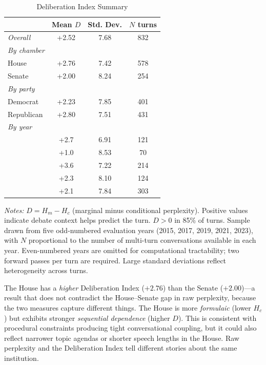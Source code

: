\documentclass[12pt]{article}
\newcommand{\Hc}{H_c}
\newcommand{\Hm}{H_m}
\newcommand{\DI}{\mathit{D}}
\begin{document}
\begin{table}[H]
\centering
\caption{Deliberation Index Summary}
\label{tab:deliberation}
\begin{threeparttable}
\begin{tabular}{lccc}
\toprule
& Mean $\DI$ & Std. Dev. & $N$ turns \\
\midrule
\textit{Overall} & +2.52 & 7.68 & 832 \\
\midrule
\textit{By chamber} \\
\quad House & +2.76 & 7.42 & 578 \\
\quad Senate & +2.00 & 8.24 & 254 \\
\midrule
\textit{By party} \\
\quad Democrat & +2.23 & 7.85 & 401 \\
\quad Republican & +2.80 & 7.51 & 431 \\
\midrule
\textit{By year} \\
\quad 2015 & +2.7 & 6.91 & 121 \\
\quad 2017 & +1.0 & 8.53 & 70 \\
\quad 2019 & +3.6 & 7.22 & 214 \\
\quad 2021 & +2.3 & 8.10 & 124 \\
\quad 2023 & +2.1 & 7.84 & 303 \\
\bottomrule
\end{tabular}
\begin{tablenotes}[flushleft]
\small
\item \textit{Notes:} $\DI = \Hm - \Hc$ (marginal minus conditional perplexity). Positive values indicate debate context helps predict the turn. $\DI > 0$ in 85\% of turns. Sample drawn from five odd-numbered evaluation years (2015, 2017, 2019, 2021, 2023), with $N$ proportional to the number of multi-turn conversations available in each year. Even-numbered years are omitted for computational tractability; two forward passes per turn are required. Large standard deviations reflect heterogeneity across turns.
\end{tablenotes}
\end{threeparttable}
\end{table}

The House has a \textit{higher} Deliberation Index ($+2.76$) than the Senate ($+2.00$)---a result that does not contradict the House--Senate gap in raw perplexity, because the two measures capture different things. The House is more \textit{formulaic} (lower $\Hc$) but exhibits stronger \textit{sequential dependence} (higher $\DI$). This is consistent with procedural constraints producing tight conversational coupling, but it could also reflect narrower topic agendas or shorter speech lengths in the House. Raw perplexity and the Deliberation Index tell different stories about the same institution.
\end{document}
